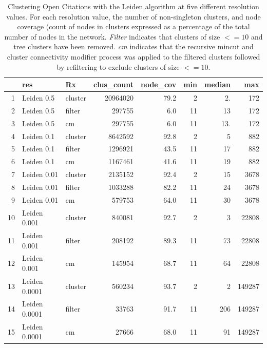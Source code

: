 \documentclass[a4paper]{article}   	%
\begin{document}
\begin{table}[ht]
\centering
\begin{tabular}{rllrrrrr}
  \hline
 & res & Rx & clus\_count & node\_cov & min & median & max \\ 
  \hline
1 & Leiden 0.5 & cluster & 20964020 & 79.2 &   2 & 2. & 172 \\ 
  2 & Leiden 0.5 & filter & 297755 & 6.0 &  11 & 13 & 172 \\ 
  3 & Leiden 0.5 & cm & 297755 & 6.0 &  11 & 13. & 172 \\ 
  \hline
  4 & Leiden 0.1 & cluster & 8642592 & 92.8 &   2 & 5 & 882 \\ 
  5 & Leiden 0.1 & filter & 1296921 & 43.5 &  11 & 17 & 882 \\ 
  6 & Leiden 0.1 & cm & 1167461 & 41.6 &  11 & 19 & 882 \\ 
  \hline
  7 & Leiden 0.01 & cluster & 2135152 & 92.4 &   2 & 15 & 3678 \\ 
  8 & Leiden 0.01 & filter & 1033288 & 82.2 &  11 & 24 & 3678 \\ 
  9 & Leiden 0.01 & cm & 579753 & 64.0 &  11 & 30 & 3678 \\ 
  \hline
  10 & Leiden 0.001 & cluster & 840081 & 92.7 &   2 & 3 & 22808 \\ 
  11 & Leiden 0.001 & filter & 208192 & 89.3 &  11 & 73 & 22808 \\ 
  12 & Leiden 0.001 & cm & 145954 & 68.7 &  11 & 64 & 22808 \\ 
  \hline
  13 & Leiden 0.0001 & cluster & 560234 & 93.7 &   2 & 2 & 149287 \\ 
  14 & Leiden 0.0001 & filter & 33763 & 91.7 &  11 & 206 & 149287 \\ 
  15 & Leiden 0.0001 & cm & 27666 & 68.0 &  11 & 91 & 149287 \\ 
   \hline
\end{tabular}
\caption{Clustering Open Citations with the Leiden algorithm at five different resolution values. For each resolution value, the number of non-singleton clusters, and node coverage (count of nodes in clusters expressed as a percentage of the total number of nodes in the network. \emph{Filter} indicates that clusters of size $<=10$ and tree clusters have been removed. \emph{cm} indicates that the recursive mincut and cluster connectivity modifier process was applied to the filtered clusters followed by refiltering to exclude clusters of size $<=10$.}
\label{tab: cm_stats}
\end{table}
\end{document}
